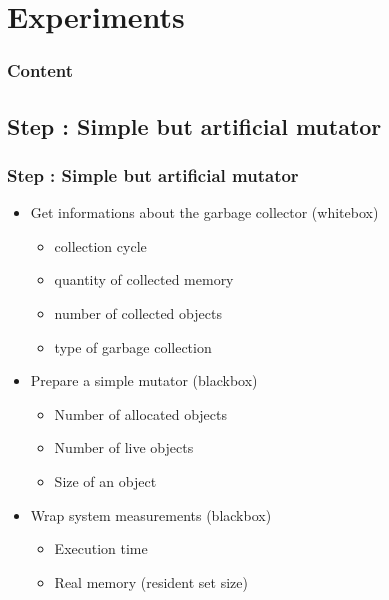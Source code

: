 %
%
\section{Experiments}

\begin{frame}
	\frametitle{Content}
	\setcounter{tocdepth}{2}
	\tableofcontents[currentsection]
\end{frame}


\subsection{Step \theStepCounter: Simple but artificial mutator}
\begin{frame}
	\frametitle{Step \theStepCounter: Simple but artificial mutator}
	\begin{itemize}
		\item Get informations about the garbage collector (whitebox)
		\begin{itemize}
			\item collection cycle
			\item quantity of collected memory
			\item number of collected objects
			\item type of garbage collection
		\end{itemize}
			
		\pause
			
		\item Prepare a simple mutator (blackbox)
		\begin{itemize}
			\item Number of allocated objects
			\item Number of live objects
			\item Size of an object
		\end{itemize}
			
		\pause
			
		\item Wrap system measurements (blackbox)
		\begin{itemize}
			\item Execution time
			\item Real memory (resident set size) 
		\end{itemize}
	\end{itemize}
\end{frame}
	
